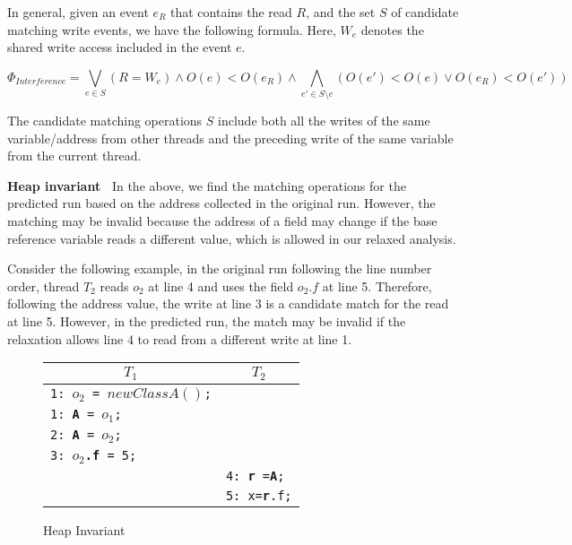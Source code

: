 In general,  given an event $e_R$ that contains the read $R$, and the set $S$ of candidate matching write events, we have the following formula. Here, $W_e$ denotes the shared write access included in the event $e$. 


$$
\Phi_{Interference}= \bigvee_{e\in S} (R=W_e) \wedge O(e)<O(e_R)
\wedge \bigwedge_{e'\in S\setminus e} (O(e')<O(e) \vee O(e_R)<O(e'))
$$


The candidate matching operations $S$ include both all the writes of the same variable/address from other threads and the preceding write of the same variable from the current thread. 


{\bf Heap invariant\ } In the above, we find the matching operations for the predicted run based on the address collected in the original run.
However, the matching may be invalid because the address of a field may change if the base reference variable reads a different value, which is allowed in our relaxed analysis. 

Consider the following example, in the original run following the line number order, thread $T_2$ reads $o_2$ at line 4 and uses the field $o_2.f$ at line 5. 
Therefore, following the address value, the write at line 3 is a candidate match for the read at line 5. However, in the predicted run, the match may be invalid if the relaxation allows line 4 to read from a different write at line 1.


\begin{figure}
\centering
\begin{tabular}{ll}
\hline
\multicolumn{1}{c}{$T_1$} & \multicolumn{1}{c}{$T_2$} \\
\hline
{\tt 1: {\bf $o_2$} = $new ClassA()$;} & \\
{\tt 1: {\bf A} = $o_1$;} & \\
{\tt 2: {\bf A} = $o_2$;} & \\
{\tt 3: {\bf $o_2$.f} = 5;} & \\
& {\tt 4: {\bf r} ={\bf A}; } \\
& {\tt 5: x={\bf r}.f;} \\	
\end{tabular}
\caption{Heap Invariant}
\label{fig:heapinv}
\end{figure}


